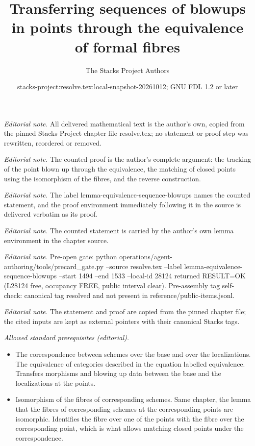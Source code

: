 \documentclass[10pt,a4paper]{amsart}
\title{Transferring sequences of blowups in points through the equivalence of formal fibres}
\author{The Stacks Project Authors}
\date{stacks-project:resolve.tex:local-snapshot-20261012; GNU FDL 1.2 or later}
\theoremstyle{plain}
\theoremstyle{definition}
\theoremstyle{remark}
\numberwithin{equation}{subsection}
\begin{document}
\maketitle
\noindent\textit{Editorial note.} All delivered mathematical text is the author's own, copied from the pinned Stacks Project chapter file resolve.tex; no statement or proof step was rewritten, reordered or removed.\par\medskip
\noindent\textit{Editorial note.} The counted proof is the author's complete argument: the tracking of the point blown up through the equivalence, the matching of closed points using the isomorphism of the fibres, and the reverse construction.\par\medskip
\noindent\textit{Editorial note.} The label lemma-equivalence-sequence-blowups names the counted statement, and the proof environment immediately following it in the source is delivered verbatim as its proof.\par\medskip
\noindent\textit{Editorial note.} The counted statement is carried by the author's own lemma environment in the chapter source.\par\medskip
\noindent\textit{Editorial note.} Pre-open gate: python operations/agent-authoring/tools/precard\_gate.py --source resolve.tex --label lemma-equivalence-sequence-blowups --start 1494 --end 1533 --local-id 28124 returned RESULT=OK (L28124 free, occupancy FREE, public interval clear). Pre-assembly tag self-check: canonical tag resolved and not present in reference/public-items.jsonl.\par\medskip
\noindent\textit{Editorial note.} The statement and proof are copied from the pinned chapter file; the cited inputs are kept as external pointers with their canonical Stacks tags.\par\medskip
\noindent\textit{Allowed standard prerequisites (editorial).}\begin{itemize}
\item The correspondence between schemes over the base and over the localizations. The equivalence of categories described in the equation labelled equivalence. Transfers morphisms and blowing up data between the base and the localizations at the points.
\item Isomorphism of the fibres of corresponding schemes. Same chapter, the lemma that the fibres of corresponding schemes at the corresponding points are isomorphic. Identifies the fibre over one of the points with the fibre over the corresponding point, which is what allows matching closed points under the correspondence.
\end{itemize}\medskip
\end{document}
